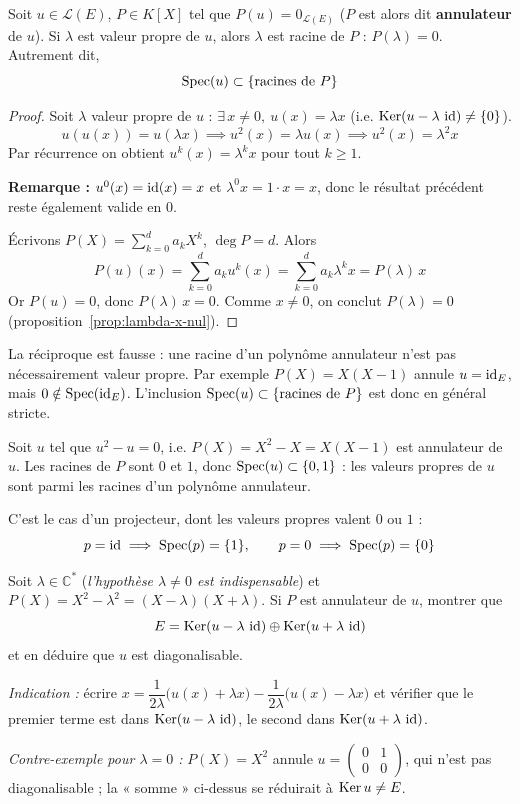 \begin{prop}
\label{prop:vp-racines-annulateur}
Soit $u\in\mathcal{L}(E)$, $P\in K[X]$ tel que $P(u)=0_{\mathcal{L}(E)}$ ($P$ est alors dit \textbf{annulateur} de $u$). Si $\lambda$ est valeur propre de $u$, alors $\lambda$ est racine de $P$ : $P(\lambda)=0$. Autrement dit,
\[\operatorname{Spec}(u) \subset \{\text{racines de } P\}\]
\end{prop}

\begin{proof}
Soit $\lambda$ valeur propre de $u$ : $\exists\, x\neq 0,\ u(x)=\lambda x$ (i.e. $\operatorname{Ker}(u-\lambda\,\operatorname{id})\neq\{0\}$).
\[u(u(x)) = u(\lambda x) \implies u^2(x) = \lambda u(x) \implies u^2(x)=\lambda^2 x\]
Par récurrence on obtient $u^k(x)=\lambda^k x$ pour tout $k\geq 1$.

\textbf{Remarque :} $u^0(x)=\operatorname{id}(x)=x$ et $\lambda^0 x = 1\cdot x = x$, donc le résultat précédent reste également valide en $0$.

Écrivons $P(X) = \displaystyle\sum_{k=0}^{d} a_k X^k$, $\deg P = d$. Alors
\[P(u)(x) = \sum_{k=0}^{d} a_k u^k(x) = \sum_{k=0}^{d} a_k \lambda^k x = P(\lambda)\, x\]
Or $P(u)=0$, donc $P(\lambda)\, x = 0$. Comme $x\neq 0$, on conclut $P(\lambda)=0$ (proposition~\ref{prop:lambda-x-nul}).
\end{proof}

\begin{remarque}
La réciproque est fausse : une racine d'un polynôme annulateur n'est pas nécessairement valeur propre. Par exemple $P(X)=X(X-1)$ annule $u=\operatorname{id}_E$, mais $0\notin\operatorname{Spec}(\operatorname{id}_E)$. L'inclusion $\operatorname{Spec}(u)\subset\{\text{racines de }P\}$ est donc en général stricte.
\end{remarque}

\begin{exemple}
Soit $u$ tel que $u^2-u=0$, i.e. $P(X)=X^2-X=X(X-1)$ est annulateur de $u$. Les racines de $P$ sont $0$ et $1$, donc $\operatorname{Spec}(u)\subset\{0,1\}$ : les valeurs propres de $u$ sont parmi les racines d'un polynôme annulateur.

C'est le cas d'un projecteur, dont les valeurs propres valent $0$ ou $1$ :
\[p=\operatorname{id} \implies \operatorname{Spec}(p)=\{1\}, \qquad p=0 \implies \operatorname{Spec}(p)=\{0\}\]
\end{exemple}

\begin{exemple}
Soit $\lambda\in\mathbb{C}^*$ (\emph{l'hypothèse $\lambda\neq 0$ est indispensable}) et $P(X)=X^2-\lambda^2 = (X-\lambda)(X+\lambda)$. Si $P$ est annulateur de $u$, montrer que
\[E = \operatorname{Ker}(u-\lambda\,\operatorname{id}) \oplus \operatorname{Ker}(u+\lambda\,\operatorname{id})\]
et en déduire que $u$ est diagonalisable.

\emph{Indication :} écrire $x = \dfrac{1}{2\lambda}\big(u(x)+\lambda x\big) - \dfrac{1}{2\lambda}\big(u(x)-\lambda x\big)$ et vérifier que le premier terme est dans $\operatorname{Ker}(u-\lambda\,\operatorname{id})$, le second dans $\operatorname{Ker}(u+\lambda\,\operatorname{id})$.

\emph{Contre-exemple pour $\lambda=0$ :} $P(X)=X^2$ annule $u=\begin{pmatrix}0&1\\0&0\end{pmatrix}$, qui n'est pas diagonalisable ; la « somme » ci-dessus se réduirait à $\operatorname{Ker} u\neq E$.
\end{exemple}

